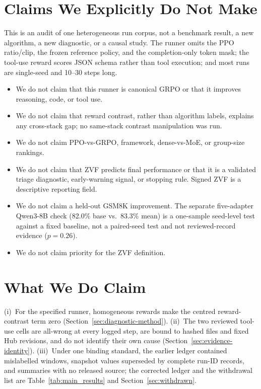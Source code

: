 \documentclass{article}
\begin{document}
\section*{Claims We Explicitly Do Not Make}
\label{sec:claims_we_do_not_make}

This is an audit of one heterogeneous run corpus, not a benchmark result, a new
algorithm, a new diagnostic, or a causal study. The runner omits the PPO
ratio/clip, the frozen reference policy, and the completion-only token mask; the
tool-use reward scores JSON schema rather than tool execution; and most runs are
single-seed and 10--30 steps long.
\begin{itemize}[leftmargin=*,itemsep=1pt]
\item We do not claim that this runner is canonical GRPO or that it improves reasoning, code, or tool use.
\item We do not claim that reward contrast, rather than algorithm labels, explains any cross-stack gap; no same-stack contrast manipulation was run.
\item We do not claim PPO-vs-GRPO, framework, dense-vs-MoE, or group-size rankings.
\item We do not claim that ZVF predicts final performance or that it is a validated triage diagnostic, early-warning signal, or stopping rule. Signed ZVF is a descriptive reporting field.
\item We do not claim a held-out GSM8K improvement. The separate five-adapter Qwen3-8B check (82.0\% base vs.\ 83.3\% mean) is a one-sample seed-level test against a fixed baseline, not a paired-seed test and not reviewed-record evidence ($p=0.26$).
\item We do not claim priority for the ZVF definition.
\end{itemize}

\section*{What We Do Claim}
\label{sec:what_we_claim}
(i)~For the specified runner, homogeneous rewards make the centred
reward-contrast term zero (Section~\ref{sec:diagnostic-method}).
(ii)~The two reviewed tool-use cells are all-wrong at every logged step, are
bound to hashed files and fixed Hub revisions, and do not identify their own
cause (Section~\ref{sec:evidence-identity}).
(iii)~Under one binding standard, the earlier ledger contained mislabelled
windows, snapshot values superseded by complete run-ID records, and summaries
with no released source; the corrected ledger and the withdrawal list are
Table~\ref{tab:main_results} and Section~\ref{sec:withdrawn}.
\end{document}
